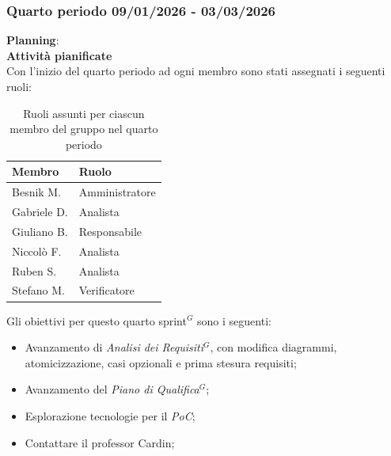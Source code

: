 \documentclass[a4paper,10pt]{article}
\begin{document}
\subsubsection{Quarto periodo 09/01/2026 - 03/03/2026}
\textbf{Planning}: \\
\textbf{Attività pianificate} \\ Con l'inizio del quarto periodo ad ogni membro sono stati assegnati i seguenti ruoli:
\begin{table}[H]
  \centering
  \begin{tabular}{|l|l|}
    \hline
    \textbf{Membro} & \textbf{Ruolo} \\
    \hline
    Besnik M.  & Amministratore \\
    \hline
    Gabriele D.  & Analista \\
    \hline
    Giuliano B. & Responsabile \\
    \hline
    Niccolò F. & Analista \\
    \hline
    Ruben S. & Analista \\
    \hline
    Stefano M.  & Verificatore \\
    \hline
  \end{tabular}
  \caption{Ruoli assunti per ciascun membro del gruppo nel quarto periodo}
\end{table}

Gli obiettivi per questo quarto sprint$^G$ sono i seguenti:
\begin{itemize}
  \item Avanzamento di \textit{Analisi dei Requisiti$^G$}, con modifica diagrammi, atomicizzazione, casi opzionali e prima stesura requisiti;
  \item Avanzamento del \textit{Piano di Qualifica$^G$};
  \item Esplorazione tecnologie per il \textit{PoC};
  \item Contattare il professor Cardin;
\end{itemize}
\end{document}
